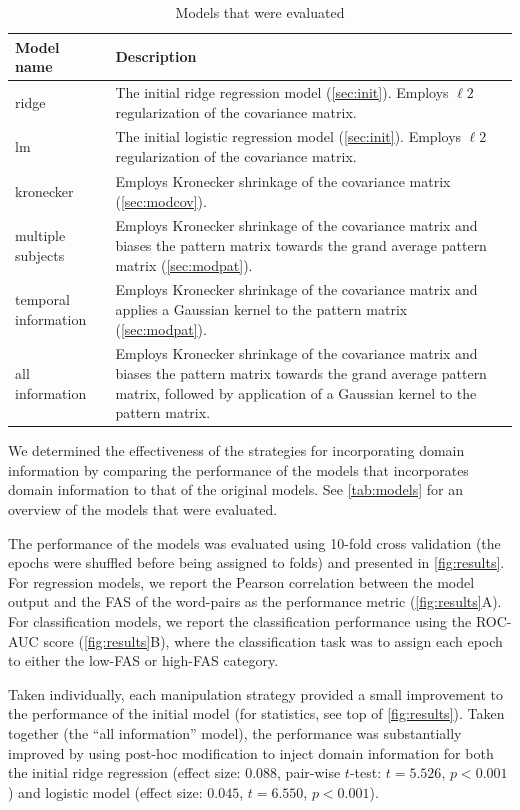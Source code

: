 \documentclass[a4paper]{vanvliet_paper}
\begin{document}
\begin{table}
    \begin{tabular}{lp{10cm}l}
        Model name & Description\\
        \midrule
        ridge & The initial ridge regression model (\autoref{sec:init}). Employs $\ell2$ regularization of the covariance matrix.\\
        lm & The initial logistic regression model (\autoref{sec:init}). Employs $\ell2$ regularization of the covariance matrix.\\
        kronecker & Employs Kronecker shrinkage of the covariance matrix (\autoref{sec:modcov}).\\
        multiple subjects & Employs Kronecker shrinkage of the covariance matrix and biases the pattern matrix towards the grand average pattern matrix (\autoref{sec:modpat}).\\
        temporal information & Employs Kronecker shrinkage of the covariance matrix and applies a Gaussian kernel to the pattern matrix (\autoref{sec:modpat}).\\
        all information & Employs Kronecker shrinkage of the covariance matrix and biases the pattern matrix towards the grand average pattern matrix, followed by application of a Gaussian kernel to the pattern matrix.
    \end{tabular}
    \caption{Models that were evaluated}\label{tab:models}
\end{table}

We determined the effectiveness of the strategies for incorporating domain information by comparing the performance of the models that incorporates domain information to that of the original models.
See \autoref{tab:models} for an overview of the models that were evaluated.

The performance of the models was evaluated using 10-fold cross validation (the epochs were shuffled before being assigned to folds) and presented in \autoref{fig:results}.
For regression models, we report the Pearson correlation between the model output and the \gls{FAS} of the word-pairs as the performance metric (\autoref{fig:results}A). 
For classification models, we report the classification performance using the \gls{ROC-AUC} score (\autoref{fig:results}B), where the classification task was to assign each epoch to either the low-\gls{FAS} or high-\gls{FAS} category.

Taken individually, each manipulation strategy provided a small improvement to the performance of the initial model (for statistics, see top of \autoref{fig:results}).
Taken together (the ``all information'' model), the performance was substantially improved by using post-hoc modification to inject domain information for both the initial ridge regression (effect size: $0.088$, pair-wise $t$-test: $t=5.526$, $p<0.001$) and logistic model (effect size: $0.045$, $t=6.550$, $p<0.001$).
\end{document}
